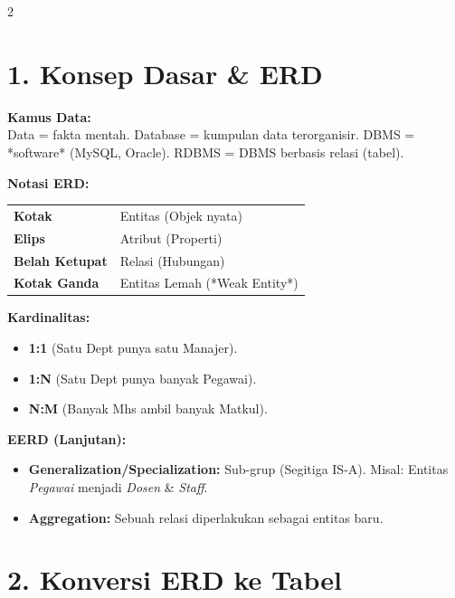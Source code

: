 \documentclass[10pt,a4paper]{article}
\begin{document}
\vspace{-1em}
\begin{multicols*}{2}

\section*{1. Konsep Dasar \& ERD}

\textbf{Kamus Data:} \\
Data = fakta mentah. Database = kumpulan data terorganisir. DBMS = *software* (MySQL, Oracle). RDBMS = DBMS berbasis relasi (tabel).

\textbf{Notasi ERD:} \\
\begin{tabularx}{\linewidth}{@{}l X@{}}
    \textbf{Kotak} & Entitas (Objek nyata) \\
    \textbf{Elips} & Atribut (Properti) \\
    \textbf{Belah Ketupat} & Relasi (Hubungan) \\
    \textbf{Kotak Ganda} & Entitas Lemah (*Weak Entity*) \\
\end{tabularx}

\textbf{Kardinalitas:} 
\begin{itemize}
    \item \textbf{1:1} (Satu Dept punya satu Manajer).
    \item \textbf{1:N} (Satu Dept punya banyak Pegawai).
    \item \textbf{N:M} (Banyak Mhs ambil banyak Matkul).
\end{itemize}

\textbf{EERD (Lanjutan):}
\begin{itemize}
    \item \textbf{Generalization/Specialization:} Sub-grup (Segitiga IS-A). Misal: Entitas \textit{Pegawai} menjadi \textit{Dosen} \& \textit{Staff}.
    \item \textbf{Aggregation:} Sebuah relasi diperlakukan sebagai entitas baru.
\end{itemize}

\section*{2. Konversi ERD ke Tabel}


\end{multicols*}
\end{document}
